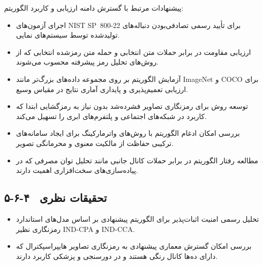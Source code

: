 پیشنهادات مرتبط با گسترش دامنه ارزیابی و کاربرد الگوریتم:

\begin{itemize}
    \item اجرای آزمون‌های ‎NIST‎ ‎SP~800-22‎ برای تأیید رسمی تصادفی‌بودن دنباله‌های تولیدشده توسط سیستم‌های نمایی.
\end{itemize}

\begin{itemize}
    \item ارزیابی مقاومت در برابر حملات متن انتخابی و حمله متن رمزشده انتخابی که از روش‌های تحلیل رمز پیشرفته محسوب می‌شوند.
\end{itemize}

\begin{itemize}
    \item آزمایش الگوریتم بر روی مجموعه داده‌های بزرگ‌تر مانند ‎ImageNet‎ و ‎COCO‎ برای ارزیابی تعمیم‌پذیری و پایداری آماری نتایج در مقیاس وسیع.
\end{itemize}

\begin{itemize}
    \item توسعه روش برای رمزنگاری تصاویر فشرده‌شد بدون نیاز به رمزگشایی ابتدا که کاربرد در شبکه‌های اجتماعی و پلتفرم‌های ابری را تسهیل می‌کند.
\end{itemize}

\begin{itemize}
    \item بررسی امکان ادغام الگوریتم با روش‌های واترمارکینگ برای ایجاد سامانه‌های ترکیبی حفاظت از مالکیت معنوی و محرمانگی تصویر.
\end{itemize}

\begin{itemize}
    \item مطالعه رفتار الگوریتم در برابر حملات کانال جانبی مانند تحلیل توان مصرفی که در پیاده‌سازی‌های سخت‌افزاری اهمیت دارند.
\end{itemize}

\subsection{۵-۶-۴  تحقیقات نظری}

\begin{itemize}
    \item تحلیل رسمی امنیت اثبات‌پذیر برای الگوریتم پیشنهادی بر اساس مدل‌های استاندارد رمزنگاری نظیر ‎IND-CPA‎ و ‎IND-CCA.‎
\end{itemize}

\begin{itemize}
    \item بررسی امکان گسترش معماری پیشنهادی به رمزنگاری تصاویر هایپراسپکترال که دارای ده‌ها کانال رنگی هستند و در دورسنجی و پزشکی کاربرد دارند.
\end{itemize}


